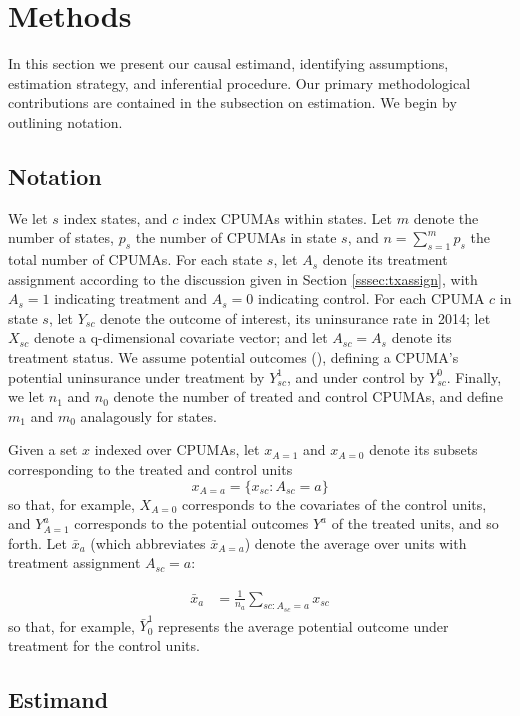 \documentclass[aoas]{imsart}
\theoremstyle{plain}
\theoremstyle{remark}
\begin{document}
\section{Methods}\label{sec:methods}

In this section we present our causal estimand, identifying assumptions, estimation strategy, and inferential procedure. Our primary methodological contributions are contained in the subsection on estimation. We begin by outlining notation.

\subsection{Notation}
We let $s$ index states, and $c$ index CPUMAs within states. Let $m$ denote the number of states, $p_s$  the number of CPUMAs in state $s$, and $n = \sum_{s=1}^m p_s$ the total number of CPUMAs. For each state $s$, let $A_s$ denote its treatment assignment according to the discussion given in Section \ref{sssec:txassign}, with $A_s = 1$ indicating treatment and $A_s=0$ indicating control. For each CPUMA $c$ in state $s$, let $Y_{sc}$ denote the outcome of interest, its uninsurance rate in 2014; let $X_{sc}$ denote a q-dimensional covariate vector; and let $A_{sc} = A_{s}$ denote its treatment status. We assume potential outcomes (\cite{rubin2005causal}), defining a CPUMA's potential uninsurance under treatment by $Y^1_{sc}$, and under control by $Y^0_{sc}$. Finally, we let $n_1$ and $n_0$ denote the number of treated and control CPUMAs, and define $m_1$ and $m_0$ analagously for states.

Given a set $x$ indexed over CPUMAs, let $x_{A=1}$ and $x_{A=0}$ denote its subsets corresponding to the treated and control units
\[ x_{A=a} = \{x_{sc}: A_{sc}=a\}\]
so that, for example, $X_{A=0}$ corresponds to the covariates of the control units, and $Y_{A=1}^a$ corresponds to the potential outcomes $Y^a$ of the treated units, and so forth. Let $\bar{x}_a$ (which abbreviates $\bar{x}_{A=a}$) denote the average over units with treatment assignment $A_{sc} = a$:

\begin{align*}
	\bar{x}_a & = \frac{1}{n_a} \sum_{sc: A_{sc}=a} x_{sc}
\end{align*}
so that, for example, $\bar{Y}_0^1$ represents the average potential outcome under treatment for the control units.

\subsection{Estimand} \label{ssec:estimand}
\end{document}

